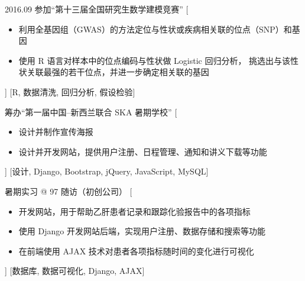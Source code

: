 \documentclass[zh]{resume}
\begin{document}
\begin{experiences}


  \separator{0.5em}
  \experience
    {2016.09}%
    {参加\enquote{第十三届全国研究生数学建模竞赛}}%
    [\begin{itemize}
      \item 利用全基因组（GWAS）的方法定位与性状或疾病相关联的位点（SNP）和基因
      \item 使用 R 语言对样本中的位点编码与性状做 Logistic 回归分析，
            挑选出与该性状关联最强的若干位点，并进一步确定相关联的基因
    \end{itemize}]%
    [R, 数据清洗, 回归分析, 假设检验]

  \separator{0.5em}
    {筹办\enquote{第一届中国--新西兰联合 SKA 暑期学校}}%
    [\begin{itemize}
      \item 设计并制作宣传海报
      \item 设计并开发网站，提供用户注册、日程管理、通知和讲义下载等功能
    \end{itemize}]%
    [设计, Django, Bootstrap, jQuery, JavaScript, MySQL]

  \separator{0.5em}
    {暑期实习 @ 97 随访（初创公司）}%
    [\begin{itemize}
      \item 开发网站，用于帮助乙肝患者记录和跟踪化验报告中的各项指标
      \item 使用 Django 开发网站后端，实现用户注册、数据存储和搜索等功能
      \item 在前端使用 AJAX 技术对患者各项指标随时间的变化进行可视化
    \end{itemize}]%
    [数据库, 数据可视化, Django, AJAX]

\end{experiences}
\end{document}
